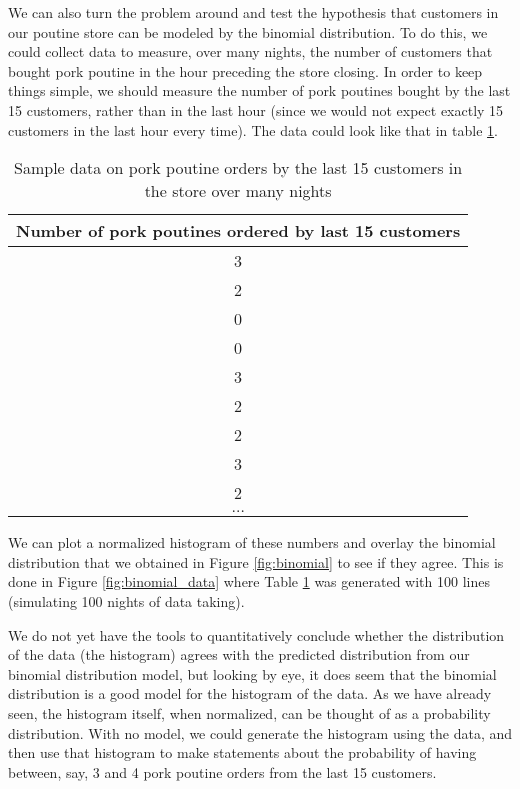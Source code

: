 
We can also turn the problem around and test the hypothesis that customers in our poutine store can be modeled by the binomial distribution. To do this, we could collect data to measure, over many nights, the number of customers that bought pork poutine in the hour preceding the store closing. In order to keep things simple, we should measure the number of pork poutines bought by the last 15 customers, rather than in the last hour (since we would not expect exactly 15 customers in the last hour every time). The data could look like that in table \ref{tab:poutineOrders}.
\begin{table}[h!]
\center
\begin{tabular}{|c|}
\hline \textbf{Number of pork poutines ordered by last 15 customers} \\
\hline
3\\
\hline
2\\
\hline
0\\
\hline
0\\
\hline
3\\
\hline
2\\
\hline
2\\
\hline
3\\
\hline
2\\
\hline
 $\dots$ \\
 \hline
\end{tabular}
\caption{\label{tab:poutineOrders} Sample data on pork poutine orders by the last 15 customers in the store over many nights}
\end{table} 

We can plot a normalized histogram of these numbers and overlay the binomial distribution that we obtained in Figure \ref{fig:binomial} to see if they agree. This is done in Figure \ref{fig:binomial_data} where Table \ref{tab:poutineOrders} was generated with 100 lines (simulating 100 nights of data taking).


We do not yet have the tools to quantitatively conclude whether the distribution of the data (the histogram) agrees with the predicted distribution from our binomial distribution model, but looking by eye, it does seem that the binomial distribution is a good model for the histogram of the data. As we have already seen, the histogram itself, when normalized, can be thought of as a probability distribution. With no model, we could generate the histogram using the data, and then use that histogram to make statements about the probability of having between, say, 3 and 4 pork poutine orders from the last 15 customers. 

